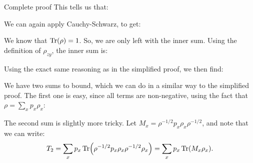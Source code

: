 \documentclass[a4paper]{article}
\begin{document}
\begin{parag}{}
\begin{subparag}{Complete proof}
        This tells us that: 
        
        We can again apply Cauchy-Schwarz, to get: 
        
        We know that $\Tr\left(\rho\right) = 1$. So, we are only left with the inner sum. Using the definition of $\rho_{zy}$, the inner sum is: 

        Using the exact same reasoning as in the simplified proof, we then find:

        We have two sums to bound, which we can do in a similar way to the simplified proof. The first one is easy, since all terms are non-negative, using the fact that $\rho = \sum_{x} p_x \rho_x$:

        The second sum is slightly more tricky. Let $M_x = \rho^{-1/2} p_x \rho_x \rho^{-1/2}$, and note that we can write: 
        \[T_2 = \sum_{x} p_x \Tr\left(\rho^{-1/2} p_x \rho_x \rho^{-1/2} \rho_{x}\right) = \sum_{x} p_x \Tr\left(M_x \rho_x\right).\]
        

\end{subparag}
\end{parag}
\end{document}

